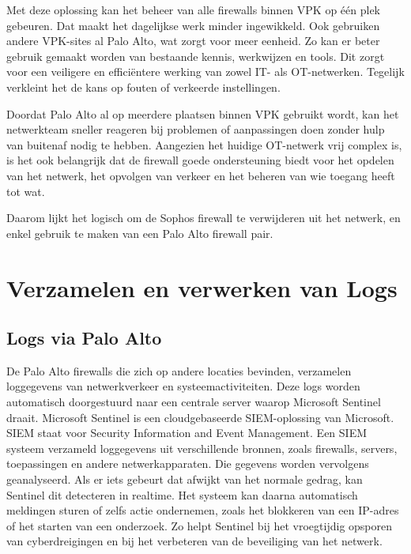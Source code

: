 Met deze oplossing kan het beheer van alle firewalls binnen VPK op één plek gebeuren. Dat maakt het dagelijkse werk minder ingewikkeld. Ook gebruiken andere VPK-sites al Palo Alto, wat zorgt voor meer eenheid. Zo kan er beter gebruik gemaakt worden van bestaande kennis, werkwijzen en tools. Dit zorgt voor een veiligere en efficiëntere werking van zowel IT- als OT-netwerken. Tegelijk verkleint het de kans op fouten of verkeerde instellingen.

Doordat Palo Alto al op meerdere plaatsen binnen VPK gebruikt wordt, kan het netwerkteam sneller reageren bij problemen of aanpassingen doen zonder hulp van buitenaf nodig te hebben. Aangezien het huidige OT-netwerk vrij complex is, is het ook belangrijk dat de firewall goede ondersteuning biedt voor het opdelen van het netwerk, het opvolgen van verkeer en het beheren van wie toegang heeft tot wat.

Daarom lijkt het logisch om de Sophos firewall te verwijderen uit het netwerk, en enkel gebruik te maken van een Palo Alto firewall pair.

\newpage

\section{Verzamelen en verwerken van Logs}

\subsection{Logs via Palo Alto}
De Palo Alto firewalls die zich op andere locaties bevinden, verzamelen loggegevens van netwerkverkeer en systeemactiviteiten. Deze logs worden automatisch doorgestuurd naar een centrale server waarop Microsoft Sentinel draait. Microsoft Sentinel is een cloudgebaseerde SIEM-oplossing van Microsoft. SIEM staat voor Security Information and Event Management.
Een SIEM systeem verzameld loggegevens uit verschillende bronnen, zoals firewalls, servers, toepassingen en andere netwerkapparaten. Die gegevens worden vervolgens geanalyseerd. Als er iets gebeurt dat afwijkt van het normale gedrag, kan Sentinel dit detecteren in realtime. Het systeem kan daarna automatisch meldingen sturen of zelfs actie ondernemen, zoals het blokkeren van een IP-adres of het starten van een onderzoek. Zo helpt Sentinel bij het vroegtijdig opsporen van cyberdreigingen en bij het verbeteren van de beveiliging van het netwerk.


